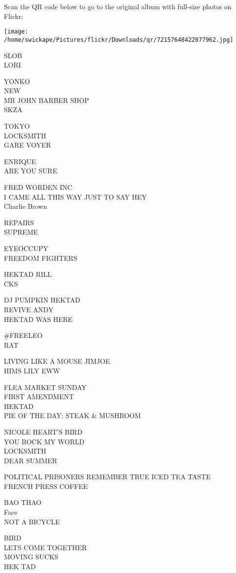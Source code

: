 \documentclass[10pt,letterpaper]{article}
\begin{document}
Scan the QR code below to go to the original album with full-size photos on Flickr:

\texttt{[image: /home/swickape/Pictures/flickr/Downloads/qr/72157648422077962.jpg]}
\pagebreak

SLOB\\
LORI

YONKO\\
NEW\\
MR JOHN BARBER SHOP\\
SKZA

TOKYO\\
LOCKSMITH\\
GARE VOYER

ENRIQUE\\
ARE YOU SURE

FRED WORDEN INC\\
I CAME ALL THIS WAY JUST TO SAY HEY\\
Charlie Brown

REPAIRS\\
SUPREME

EYEOCCUPY\\
FREEDOM FIGHTERS

HEKTAD RILL\\
CKS

DJ PUMPKIN HEKTAD\\
REVIVE ANDY\\
HEKTAD WAS HERE

\#FREELEO\\
RAT

LIVING LIKE A MOUSE JIMJOE\\
HIMS LILY EWW

FLEA MARKET SUNDAY\\
FIRST AMENDMENT\\
HEKTAD\\
PIE OF THE DAY: STEAK \& MUSHROOM

NICOLE HEART'S BIRD\\
YOU ROCK MY WORLD\\
LOCKSMITH\\
DEAR SUMMER

POLITICAL PRISONERS REMEMBER TRUE ICED TEA TASTE\\
FRENCH PRESS COFFEE

BAO THAO\\
Face\\
NOT A BICYCLE

BIRD\\
LETS COME TOGETHER\\
MOVING SUCKS\\
HEK TAD
\end{document}
